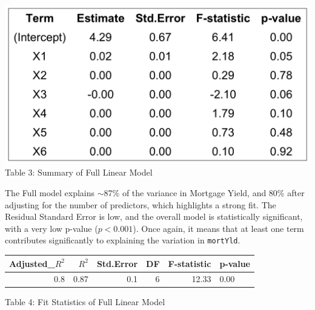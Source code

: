 \documentclass[
  12pt,
]{article}
\begin{document}
\begin{minipage}{0.42\textwidth}
\includegraphics[width=1\linewidth]{figures/full_model_summary_table.png}
\vspace{-0.1em}
{\fontsize{12}{14}\selectfont Table 3: Summary of Full Linear Model}
\end{minipage}
\hfill
\begin{minipage}{0.55\textwidth}
The Full model explains $\sim$87\% of the variance in Mortgage Yield, and 80\% after adjusting for the number of predictors, which highlights a strong fit. The Residual Standard Error is low, and the overall model is statistically significant, with a very low p-value ($p < 0.001$). Once again, it means that at least one term contributes significantly to explaining the variation in \texttt{mortYld}.
\end{minipage}

\noindent \vspace{-0.4em}

\begin{table}[!h]
\centering\begingroup\fontsize{8}{10}\selectfont

\begin{tabular}{rrrrrl}
\toprule
Adjusted\_$R^{2}$ & $R^2$ & Std.Error & DF & F-statistic & p-value\\
\midrule
0.8 & 0.87 & 0.1 & 6 & 12.33 & 0.00\\
\bottomrule
\end{tabular}
\endgroup{}
\end{table}
\begin{center}
\vspace{-2em}
{\fontsize{12}{14}\selectfont Table 4: Fit Statistics of Full Linear Model\par}
\end{center}

\addtocounter{table}{2}
\vspace{-5pt}
\end{document}
